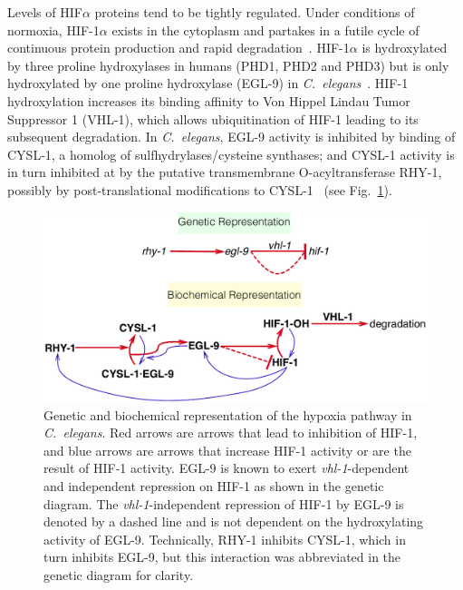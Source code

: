 \documentclass[9pt,twocolumn,twoside,lineno]{pnas-new}
\newcommand{\cel}{\emph{C.~elegans}}
\newcommand{\gene}[1]{\emph{#1}}
\newcommand{\eglp}{EGL-9}
\newcommand{\rhyp}{RHY-1}
\newcommand{\vhlp}{VHL-1}
\newcommand{\hifp}{HIF-1}
\newcommand{\cyslp}{CYSL-1}
\begin{document}
Levels of HIF$\alpha$ proteins tend to be tightly regulated. Under conditions of
normoxia, \hifp{}$\alpha$ exists in the cytoplasm and partakes in a futile cycle
of continuous protein production and rapid degradation~\cite{Huang1996}.
\hifp{}$\alpha$ is hydroxylated by three proline hydroxylases in humans (PHD1,
PHD2 and PHD3) but is only hydroxylated by one proline hydroxylase (\eglp{}) in
\cel{}~\cite{Kaelin2008}. \hifp{} hydroxylation increases its binding affinity
to Von Hippel Lindau Tumor Suppressor 1 (\vhlp{}), which allows ubiquitination
of \hifp{} leading to its subsequent degradation. In \cel{}, \eglp{} activity is
inhibited by binding of \cyslp{}, a homolog of sulfhydrylases/cysteine synthases;
and \cyslp{} activity is in turn inhibited at by the putative transmembrane
O-acyltransferase \rhyp{}, possibly by post-translational modifications to
\cyslp{}~\cite{Ma2012} (see Fig.~\ref{fig:pathway}).

\begin{figure}[tbhp]
\centering
\includegraphics[width=\linewidth]{../figs/HIF1pathway.pdf}
\caption{
Genetic and biochemical representation of the hypoxia pathway in \cel{}.
Red arrows are arrows that lead to inhibition of \hifp{}, and blue arrows
are arrows that increase \hifp{} activity or are the result of \hifp{} activity.
\eglp{} is known to exert \gene{vhl-1}-dependent and independent repression
on \hifp{} as shown in the genetic diagram. The \gene{vhl-1}-independent
repression of \hifp{} by \eglp{} is denoted by a dashed line and is not dependent
on the hydroxylating activity of \eglp{}.
Technically, RHY-1 inhibits CYSL-1, which in turn inhibits EGL-9, but this
interaction was abbreviated in the genetic diagram for clarity.
}
\label{fig:pathway}
\end{figure}
\end{document}
